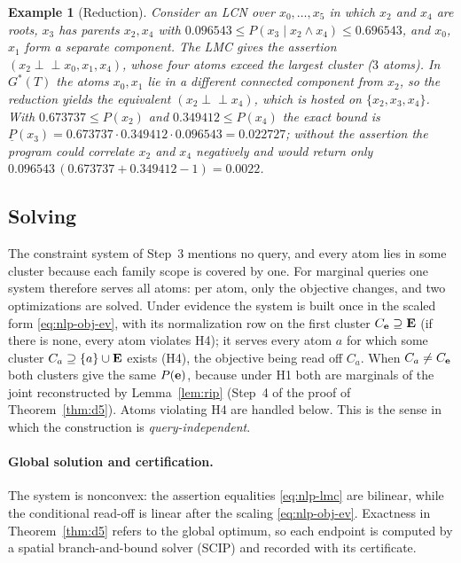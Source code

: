 \documentclass{article} %
\newtheorem{example}{Example}
\newcommand{\lo}{\underline}
\newcommand{\indep}{\perp\!\!\!\perp}
\begin{document}
\begin{example}[Reduction]\label{ex:dropped}
Consider an LCN over $x_0,\dots,x_5$ in which $x_2$ and $x_4$ are roots, $x_3$
has parents $x_2,x_4$ with $0.096543\le P(x_3\mid x_2\wedge x_4)\le0.696543$, and
$x_0$, $x_1$ form a separate component. The LMC gives the assertion
$(x_2\indep x_0,x_1,x_4)$, whose four atoms exceed the largest cluster ($3$
atoms). In $G^\ast(T)$ the atoms $x_0,x_1$ lie in a different connected component
from $x_2$, so the reduction yields the equivalent $(x_2\indep x_4)$, which is
hosted on $\{x_2,x_3,x_4\}$. With $0.673737\le P(x_2)$ and $0.349412\le P(x_4)$
the exact bound is
$\lo P(x_3)=0.673737\cdot0.349412\cdot0.096543=0.022727$; without the assertion
the program could correlate $x_2$ and $x_4$ negatively and would return only
$0.096543\,(0.673737+0.349412-1)=0.0022$.
\end{example}

\subsection{Solving}\label{sec:algo-solve}

The constraint system of Step~3 mentions no query, and every atom lies in some
cluster because each family scope is covered by one. For marginal queries one
system therefore serves all atoms: per atom, only the objective changes, and two
optimizations are solved. Under evidence the system is built once in the scaled
form \eqref{eq:nlp-obj-ev}, with its normalization row on the first cluster
$C_{\mathbf{e}}\supseteq\mathbf{E}$ (if there is none, every atom violates H4); it serves every atom $a$ for which some cluster
$C_a\supseteq\{a\}\cup\mathbf{E}$ exists (H4), the objective being read off $C_a$. When
$C_a\neq C_{\mathbf{e}}$ both clusters give the same $P(\mathbf{e})$, because under H1 both are
marginals of the joint reconstructed by Lemma~\ref{lem:rip} (Step~4 of the proof of
Theorem~\ref{thm:d5}). Atoms violating H4 are handled below. This is the sense in
which the construction is \emph{query-independent}.

\paragraph{Global solution and certification.}
The system is nonconvex: the assertion equalities \eqref{eq:nlp-lmc} are bilinear,
while the conditional read-off is linear after the scaling
\eqref{eq:nlp-obj-ev}. Exactness in
Theorem~\ref{thm:d5} refers to the global optimum, so each endpoint is computed by
a spatial branch-and-bound solver (SCIP) and recorded with its certificate.
\end{document}
